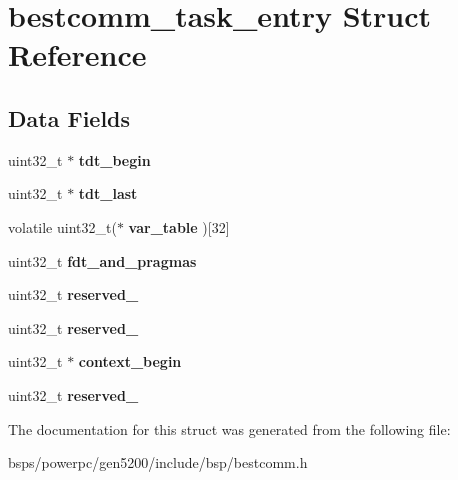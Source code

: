 \hypertarget{structbestcomm__task__entry}{}\section{bestcomm\+\_\+task\+\_\+entry Struct Reference}
\label{structbestcomm__task__entry}
\subsection*{Data Fields}
\begin{DoxyCompactItemize}
\item 
\mbox{\label{structbestcomm__task__entry_afcec326fa898660a24d5efed2871be45}} 
uint32\+\_\+t $\ast$ {\bfseries tdt\+\_\+begin}
\item 
\mbox{\label{structbestcomm__task__entry_a783b14a74fc79830b5b37e93639fe05d}} 
uint32\+\_\+t $\ast$ {\bfseries tdt\+\_\+last}
\item 
\mbox{\label{structbestcomm__task__entry_a493b052d315b3e779bd53481b246be70}} 
volatile uint32\+\_\+t($\ast$ {\bfseries var\+\_\+table} )\mbox{[}32\mbox{]}
\item 
\mbox{\label{structbestcomm__task__entry_a596b3fbd89deaec54729eb0f2b964d4b}} 
uint32\+\_\+t {\bfseries fdt\+\_\+and\+\_\+pragmas}
\item 
\mbox{\label{structbestcomm__task__entry_a2ee23e86616e69df7c510cce71264d47}} 
uint32\+\_\+t {\bfseries reserved\+\_}
\item 
\mbox{\label{structbestcomm__task__entry_a97356b895941c2a5e51fd79a9b9c7148}} 
uint32\+\_\+t {\bfseries reserved\+\_}
\item 
\mbox{\label{structbestcomm__task__entry_a06175e07f3ffd3f72174124314b93b5c}} 
uint32\+\_\+t $\ast$ {\bfseries context\+\_\+begin}
\item 
\mbox{\label{structbestcomm__task__entry_afbf01d45a1339be7c34b4ffb74ae3bc8}} 
uint32\+\_\+t {\bfseries reserved\+\_}
\end{DoxyCompactItemize}


The documentation for this struct was generated from the following file\+:\begin{DoxyCompactItemize}
\item 
bsps/powerpc/gen5200/include/bsp/bestcomm.\+h\end{DoxyCompactItemize}
